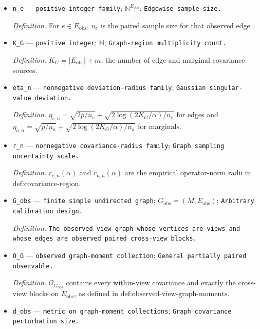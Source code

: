 \documentclass{article}
\begin{document}
\begin{itemize}
  \par\smallskip\noindent\emph{Definition.} \(\omega_{\mathrm{feas}}(u)=L_Ru\).
  \item \texttt{n\_\allowbreak{}e} --- \texttt{positive-\allowbreak{}integer family}; \(\mathbb N^{E_{\mathrm{obs}}}\); \texttt{Edgewise sample size.}
  \par\smallskip\noindent\emph{Definition.} For \(e\in E_{\mathrm{obs}}\), \(n_e\) is the paired sample size for that observed edge.
  \item \texttt{K\_\allowbreak{}G} --- \texttt{positive integer}; \(\mathbb N\); \texttt{Graph-\allowbreak{}region multiplicity count.}
  \par\smallskip\noindent\emph{Definition.} \(K_G=|E_{\mathrm{obs}}|+m\), the number of edge and marginal covariance sources.
  \item \texttt{eta\_\allowbreak{}n} --- \texttt{nonnegative deviation-\allowbreak{}radius family}; \texttt{Gaussian singular-\allowbreak{}value deviation.}
  \par\smallskip\noindent\emph{Definition.} \(\eta_{e,n}=\sqrt{2p/n_e}+\sqrt{2\log(2K_G/\alpha)/n_e}\) for edges and \(\eta_{a,n}=\sqrt{p/n_a}+\sqrt{2\log(2K_G/\alpha)/n_a}\) for marginals.
  \item \texttt{r\_\allowbreak{}n} --- \texttt{nonnegative covariance-\allowbreak{}radius family}; \texttt{Graph sampling uncertainty scale.}
  \par\smallskip\noindent\emph{Definition.} \(r_{e,n}(\alpha)\) and \(r_{a,n}(\alpha)\) are the empirical operator-norm radii in \(\text{def:covariance-region}\).
  \item \texttt{G\_\allowbreak{}obs} --- \texttt{finite simple undirected graph}; \(G_{\mathrm{obs}}=(M,E_{\mathrm{obs}})\); \texttt{Arbitrary calibration design.}
  \par\smallskip\noindent\emph{Definition.} \texttt{The observed view graph whose vertices are views and whose edges are observed paired cross-\allowbreak{}view blocks.}
  \item \texttt{O\_\allowbreak{}G} --- \texttt{observed graph-\allowbreak{}moment collection}; \texttt{General partially paired observable.}
  \par\smallskip\noindent\emph{Definition.} \(\mathcal O_{G_{\mathrm{obs}}}\) contains every within-view covariance and exactly the cross-view blocks on \(E_{\mathrm{obs}}\), as defined in \(\text{def:observed-view-graph-moments}\).
  \item \texttt{d\_\allowbreak{}obs} --- \texttt{metric on graph-\allowbreak{}moment collections}; \texttt{Graph covariance perturbation size.}

\end{itemize}
\end{document}
